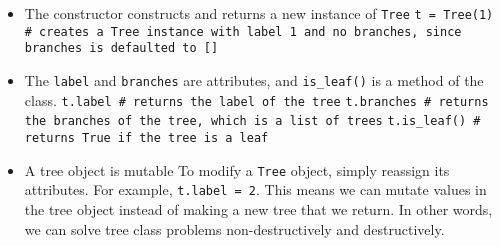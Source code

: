 \vspace{2mm}
\begin{itemize}
\item The constructor constructs and returns a new instance of \lstinline{Tree}
    \subitem \lstinline{t = Tree(1) # creates a Tree instance with label 1 and no branches, since branches is defaulted to []}
\item The \lstinline{label} and \lstinline{branches} are attributes, and \lstinline{is_leaf()} is a method of the class.
    \subitem \lstinline{t.label # returns the label of the tree}
    \subitem \lstinline{t.branches # returns the branches of the tree, which is a list of trees}
    \subitem \lstinline{t.is_leaf() # returns True if the tree is a leaf}
\item A tree object is mutable
    \subitem To modify a \lstinline{Tree} object, simply reassign its attributes. For example, \lstinline{t.label = 2}.
    \subitem This means we can mutate values in the tree object instead of making a new tree that we return. In other words, we can solve tree class problems non-destructively and destructively.
\end{itemize}
